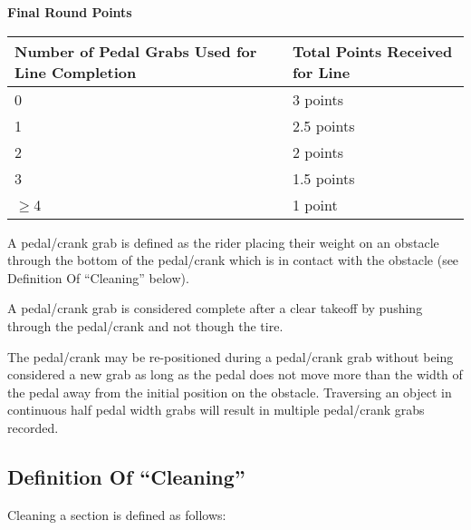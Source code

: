 \textbf{Final Round Points}

\begin{tabular}{|p{5cm}|p{4cm}|}
\hline
\textbf{Number of Pedal Grabs Used for Line Completion} & \textbf{Total Points \newline Received for Line}\\
\hline
0 & 3 points\\
\hline
1 & 2.5 points\\
\hline
2 & 2 points\\
\hline
3 & 1.5 points\\
\hline
$\geq$4 & 1 point\\
\hline
\end{tabular}

A pedal/crank grab is defined as the rider placing their weight on an obstacle through the bottom of the pedal/crank which is in contact with the obstacle (see Definition Of ``Cleaning'' below).

A pedal/crank grab is considered complete after a clear takeoff by pushing through the pedal/crank and not though the tire.

The pedal/crank may be re-positioned during a pedal/crank grab without being considered a new grab as long as the pedal does not move more than the width of the pedal away from the initial position on the obstacle.
Traversing an object in continuous half pedal width grabs will result in multiple pedal/crank grabs recorded.


\subsection{Definition Of ``Cleaning''}
Cleaning a section is defined as follows:

